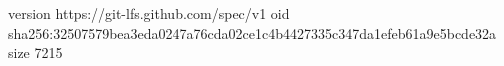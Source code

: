 version https://git-lfs.github.com/spec/v1
oid sha256:32507579bea3eda0247a76cda02ce1c4b4427335c347da1efeb61a9e5bcde32a
size 7215
